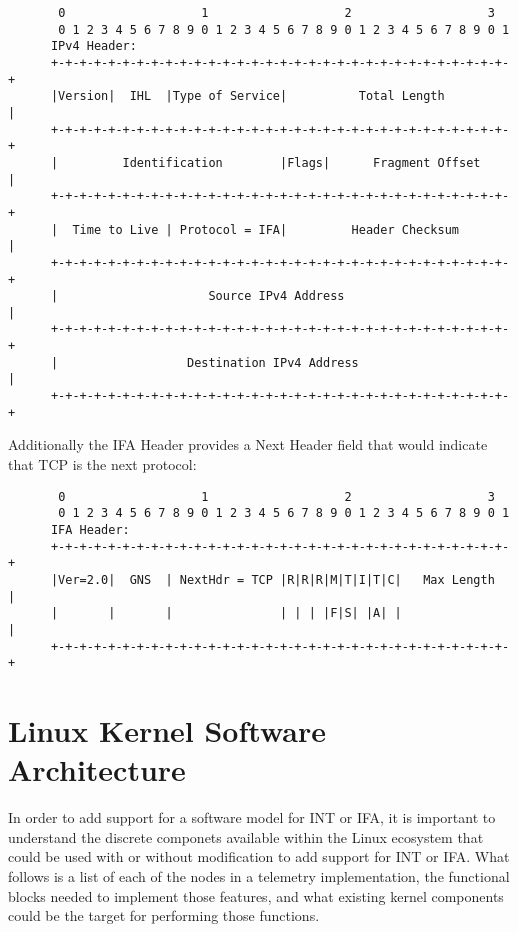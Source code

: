 \documentclass[letterpaper,twocolumn,10pt]{article}
\begin{document}
\tiny
\begin{center}
\begin{verbatim}
       0                   1                   2                   3
       0 1 2 3 4 5 6 7 8 9 0 1 2 3 4 5 6 7 8 9 0 1 2 3 4 5 6 7 8 9 0 1
      IPv4 Header:
      +-+-+-+-+-+-+-+-+-+-+-+-+-+-+-+-+-+-+-+-+-+-+-+-+-+-+-+-+-+-+-+-+
      |Version|  IHL  |Type of Service|          Total Length         |
      +-+-+-+-+-+-+-+-+-+-+-+-+-+-+-+-+-+-+-+-+-+-+-+-+-+-+-+-+-+-+-+-+
      |         Identification        |Flags|      Fragment Offset    |
      +-+-+-+-+-+-+-+-+-+-+-+-+-+-+-+-+-+-+-+-+-+-+-+-+-+-+-+-+-+-+-+-+
      |  Time to Live | Protocol = IFA|         Header Checksum       |
      +-+-+-+-+-+-+-+-+-+-+-+-+-+-+-+-+-+-+-+-+-+-+-+-+-+-+-+-+-+-+-+-+
      |                     Source IPv4 Address                       |
      +-+-+-+-+-+-+-+-+-+-+-+-+-+-+-+-+-+-+-+-+-+-+-+-+-+-+-+-+-+-+-+-+
      |                  Destination IPv4 Address                     |
      +-+-+-+-+-+-+-+-+-+-+-+-+-+-+-+-+-+-+-+-+-+-+-+-+-+-+-+-+-+-+-+-+
\end{verbatim}
\end{center}
\normalsize

Additionally the IFA Header provides a Next Header field that would
indicate that TCP is the next protocol:

\tiny
\begin{center}
\begin{verbatim}
       0                   1                   2                   3
       0 1 2 3 4 5 6 7 8 9 0 1 2 3 4 5 6 7 8 9 0 1 2 3 4 5 6 7 8 9 0 1
      IFA Header:
      +-+-+-+-+-+-+-+-+-+-+-+-+-+-+-+-+-+-+-+-+-+-+-+-+-+-+-+-+-+-+-+-+
      |Ver=2.0|  GNS  | NextHdr = TCP |R|R|R|M|T|I|T|C|   Max Length  |
      |       |       |               | | | |F|S| |A| |               |
      +-+-+-+-+-+-+-+-+-+-+-+-+-+-+-+-+-+-+-+-+-+-+-+-+-+-+-+-+-+-+-+-+
\end{verbatim}
\end{center}
\normalsize

\section{Linux Kernel Software Architecture}

In order to add support for a software model for INT or IFA, it is
important to understand the discrete componets available within the
Linux ecosystem that could be used with or without modification to
add support for INT or IFA.  What follows is a list of each of the
nodes in a telemetry implementation, the functional blocks needed to
implement those features, and what existing kernel components could be
the target for performing those functions.
\end{document}
